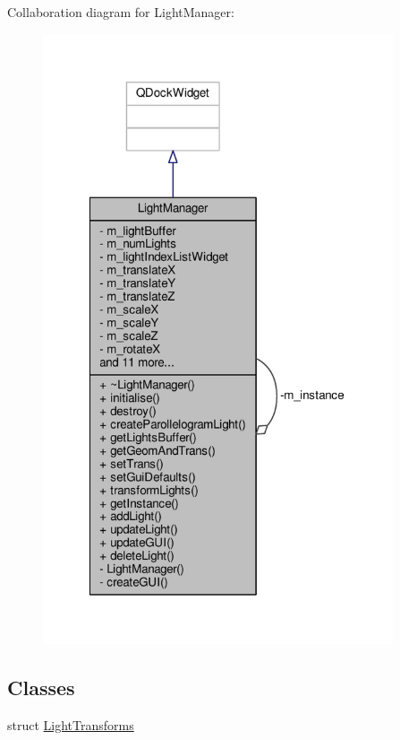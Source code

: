 Collaboration diagram for Light\-Manager\-:
\nopagebreak
\begin{figure}[H]
\begin{center}
\leavevmode
\includegraphics[width=293pt]{class_light_manager__coll__graph}
\end{center}
\end{figure}
\subsection*{Classes}
\begin{DoxyCompactItemize}
\item 
struct \hyperlink{struct_light_manager_1_1_light_transforms}{Light\-Transforms}
\end{DoxyCompactItemize}
